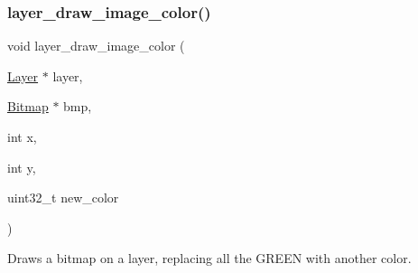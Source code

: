 \subsubsection{\texorpdfstring{layer\+\_\+draw\+\_\+image\+\_\+color()}{layer\_draw\_image\_color()}}
{\footnotesize\ttfamily void layer\+\_\+draw\+\_\+image\+\_\+color (\begin{DoxyParamCaption}\item[{\mbox{\hyperlink{struct_layer}{Layer}} $\ast$}]{layer,  }\item[{\mbox{\hyperlink{struct_bitmap}{Bitmap}} $\ast$}]{bmp,  }\item[{int}]{x,  }\item[{int}]{y,  }\item[{uint32\+\_\+t}]{new\+\_\+color }\end{DoxyParamCaption})}



Draws a bitmap on a layer, replacing all the G\+R\+E\+EN with another color. 


